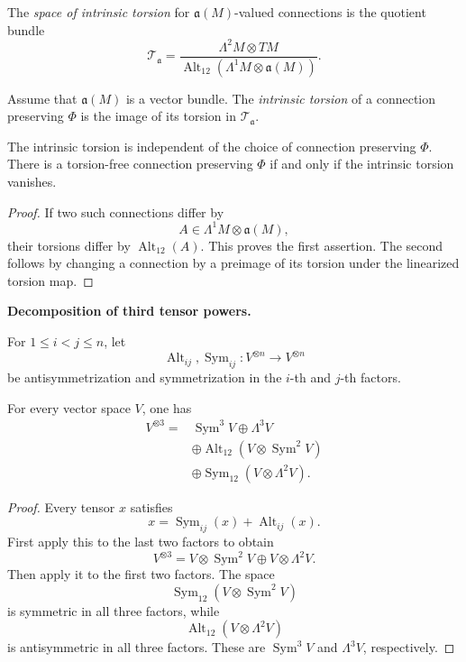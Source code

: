 \begin{definition}
\label{definition-intrinsic-torsion-space}
The {\it space of intrinsic torsion} for
$\mathfrak{a}(M)$-valued connections is
the quotient bundle
$$
\mathcal{T}_{\mathfrak{a}}
=\frac{\Lambda^2M\otimes TM}
{\operatorname{Alt}_{12}
(\Lambda^1M\otimes\mathfrak{a}(M))}.
$$
\end{definition}

\begin{definition}
\label{definition-intrinsic-torsion}
Assume that $\mathfrak{a}(M)$ is a vector
bundle. The {\it intrinsic torsion} of a
connection preserving $\Phi$ is the image
of its torsion in
$\mathcal{T}_{\mathfrak{a}}$.
\end{definition}

\begin{theorem}
\label{theorem-intrinsic-torsion}
The intrinsic torsion is independent of
the choice of connection preserving
$\Phi$. There is a torsion-free connection
preserving $\Phi$ if and only if the
intrinsic torsion vanishes.
\end{theorem}

\begin{proof}
If two such connections differ by
$$
A\in\Lambda^1M\otimes\mathfrak{a}(M),
$$
their torsions differ by
$\operatorname{Alt}_{12}(A)$. This proves
the first assertion. The second follows by
changing a connection by a preimage of its
torsion under the linearized torsion map.
\end{proof}

\medskip\noindent
{\bf Decomposition of third tensor powers.}

For $1\leq i<j\leq n$, let
$$
\operatorname{Alt}_{ij},
\operatorname{Sym}_{ij}:
V^{\otimes n}\longrightarrow V^{\otimes n}
$$
be antisymmetrization and symmetrization in
the $i$-th and $j$-th factors.

\begin{proposition}
\label{proposition-third-tensor}
For every vector space $V$, one has
$$
\begin{aligned}
V^{\otimes3}
={}&\operatorname{Sym}^3V
\oplus\Lambda^3V\\
&\oplus\operatorname{Alt}_{12}
(V\otimes\operatorname{Sym}^2V)\\
&\oplus\operatorname{Sym}_{12}
(V\otimes\Lambda^2V).
\end{aligned}
$$
\end{proposition}

\begin{proof}
Every tensor $x$ satisfies
$$
x=\operatorname{Sym}_{ij}(x)
+\operatorname{Alt}_{ij}(x).
$$
First apply this to the last two factors to
obtain
$$
V^{\otimes3}
=V\otimes\operatorname{Sym}^2V
\oplus V\otimes\Lambda^2V.
$$
Then apply it to the first two factors.
The space
$$
\operatorname{Sym}_{12}
(V\otimes\operatorname{Sym}^2V)
$$
is symmetric in all three factors, while
$$
\operatorname{Alt}_{12}
(V\otimes\Lambda^2V)
$$
is antisymmetric in all three factors.
These are $\operatorname{Sym}^3V$ and
$\Lambda^3V$, respectively.
\end{proof}

